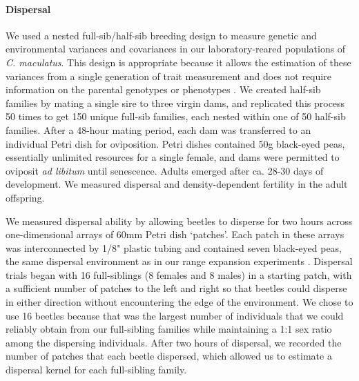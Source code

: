 \documentclass[11pt]{article}
\begin{document}
\paragraph{Dispersal}
We used a nested full-sib/half-sib breeding design to measure genetic and environmental variances and covariances in our laboratory-reared populations of \textit{C. maculatus}.
This design is appropriate because it allows the estimation of these variances from a single generation of trait measurement and does not require information on the parental genotypes or phenotypes \citep{falconer_introduction_1996,conner_primer_2004,wilson_ecologists_2010}.
We created half-sib families by mating a single sire to three virgin dams, and replicated this process 50 times to get 150 unique full-sib families, each nested within one of 50 half-sib families.
After a 48-hour mating period, each dam was transferred to an individual Petri dish for oviposition.
Petri dishes contained 50g black-eyed peas, essentially unlimited resources for a single female, and dams were permitted to oviposit \textit{ad libitum} until senescence.
Adults emerged after ca. 28-30 days of development.
We measured dispersal and density-dependent fertility in the adult offspring.

We measured dispersal ability by allowing beetles to disperse for two hours across one-dimensional arrays of 60mm Petri dish `patches'.
Each patch in these arrays was interconnected by 1/8" plastic tubing and contained seven black-eyed peas, the same dispersal environment as in our range expansion experiments \citep{ochocki_rapid_2017}.
Dispersal trials began with 16 full-siblings (8 females and 8 males) in a starting patch, with a sufficient number of patches to the left and right so that beetles could disperse in either direction without encountering the edge of the environment.
We chose to use 16 beetles because that was the largest number of individuals that we could reliably obtain from our full-sibling families while maintaining a 1:1 sex ratio among the dispersing individuals.
After two hours of dispersal, we recorded the number of patches that each beetle dispersed, which allowed us to estimate a dispersal kernel for each full-sibling family.
\end{document}

